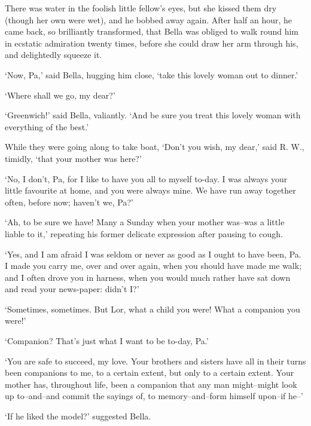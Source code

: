 There was water in the foolish little fellow’s eyes, but she kissed them
dry (though her own were wet), and he bobbed away again. After half an
hour, he came back, so brilliantly transformed, that Bella was obliged
to walk round him in ecstatic admiration twenty times, before she could
draw her arm through his, and delightedly squeeze it.

‘Now, Pa,’ said Bella, hugging him close, ‘take this lovely woman out to
dinner.’

‘Where shall we go, my dear?’

‘Greenwich!’ said Bella, valiantly. ‘And be sure you treat this lovely
woman with everything of the best.’

While they were going along to take boat, ‘Don’t you wish, my dear,’
said R. W., timidly, ‘that your mother was here?’

‘No, I don’t, Pa, for I like to have you all to myself to-day. I was
always your little favourite at home, and you were always mine. We have
run away together often, before now; haven’t we, Pa?’

‘Ah, to be sure we have! Many a Sunday when your mother was--was a
little liable to it,’ repeating his former delicate expression after
pausing to cough.

‘Yes, and I am afraid I was seldom or never as good as I ought to have
been, Pa. I made you carry me, over and over again, when you should
have made me walk; and I often drove you in harness, when you would much
rather have sat down and read your news-paper: didn’t I?’

‘Sometimes, sometimes. But Lor, what a child you were! What a companion
you were!’

‘Companion? That’s just what I want to be to-day, Pa.’

‘You are safe to succeed, my love. Your brothers and sisters have all
in their turns been companions to me, to a certain extent, but only to a
certain extent. Your mother has, throughout life, been a companion that
any man might--might look up to--and--and commit the sayings of, to
memory--and--form himself upon--if he--’

‘If he liked the model?’ suggested Bella.

